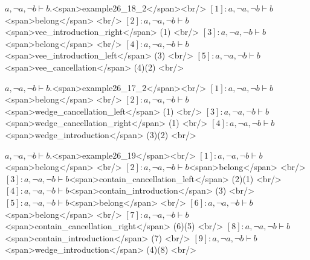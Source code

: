  \( a, \neg a, \neg b \vdash b .\)<span>example26_18_2</span><br/>
\([1]: a, \neg a, \neg b \vdash b  \)<span>belong</span>
  <br/>
\([2]: a, \neg a, \neg b \vdash b  \)<span>vee_introduction_right</span>
 (1) <br/>
\([3]: a, \neg a, \neg b \vdash b  \)<span>belong</span>
  <br/>
\([4]: a, \neg a, \neg b \vdash b  \)<span>vee_introduction_left</span>
 (3) <br/>
\([5]: a, \neg a, \neg b \vdash b  \)<span>vee_cancellation</span>
 (4)(2) <br/>

 \( a, \neg a, \neg b \vdash b .\)<span>example26_17_2</span><br/>
\([1]: a, \neg a, \neg b \vdash b  \)<span>belong</span>
  <br/>
\([2]: a, \neg a, \neg b \vdash b  \)<span>wedge_cancellation_left</span>
 (1) <br/>
\([3]: a, \neg a, \neg b \vdash b  \)<span>wedge_cancellation_right</span>
 (1) <br/>
\([4]: a, \neg a, \neg b \vdash b  \)<span>wedge_introduction</span>
 (3)(2) <br/>

 \( a, \neg a, \neg b \vdash b .\)<span>example26_19</span><br/>
\([1]: a, \neg a, \neg b \vdash b  \)<span>belong</span>
  <br/>
\([2]: a, \neg a, \neg b \vdash b  \)<span>belong</span>
  <br/>
\([3]: a, \neg a, \neg b \vdash b  \)<span>contain_cancellation_left</span>
 (2)(1) <br/>
\([4]: a, \neg a, \neg b \vdash b  \)<span>contain_introduction</span>
 (3) <br/>
\([5]: a, \neg a, \neg b \vdash b  \)<span>belong</span>
  <br/>
\([6]: a, \neg a, \neg b \vdash b  \)<span>belong</span>
  <br/>
\([7]: a, \neg a, \neg b \vdash b  \)<span>contain_cancellation_right</span>
 (6)(5) <br/>
\([8]: a, \neg a, \neg b \vdash b  \)<span>contain_introduction</span>
 (7) <br/>
\([9]: a, \neg a, \neg b \vdash b  \)<span>wedge_introduction</span>
 (4)(8) <br/>

